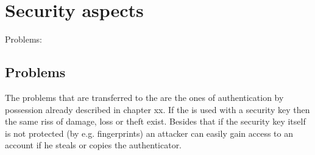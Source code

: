 \section{Security aspects}

Problems: \cite{paragon-webauth}

\subsection{Problems}

The problems that are transferred to the \wa{} are the ones of authentication by possession already described in chapter xx. If the \wa{} is used with a security key then the same riss of damage, loss or theft exist. Besides that if the security key itself is not protected (by e.g. fingerprints) an attacker can easily gain access to an account if he steals or copies the authenticator.
